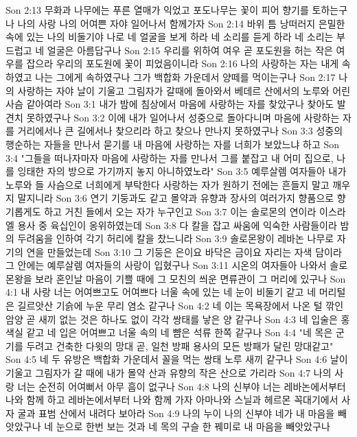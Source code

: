 Son 2:13  무화과 나무에는 푸른 열매가 익었고 포도나무는 꽃이 피어 향기를 토하는구나 나의 사랑 나의 어여쁜 자야 일어나서 함께가자
Son 2:14  바위 틈 낭떠러지 은밀한 속에 있는 나의 비둘기야 나로 네 얼굴을 보게 하라 네 소리를 듣게 하라 네 소리는 부드럽고 네 얼굴은 아름답구나
Son 2:15  우리를 위하여 여우 곧 포도원을 허는 작은 여우를 잡으라 우리의 포도원에 꽃이 피었음이니라
Son 2:16  나의 사랑하는 자는 내게 속하였고 나는 그에게 속하였구나 그가 백합화 가운데서 양떼를 먹이는구나
Son 2:17  나의 사랑하는 자야 날이 기울고 그림자가 갈때에 돌아와서 베데르 산에서의 노루와 어린 사슴 같아여라
Son 3:1  내가 밤에 침상에서 마음에 사랑하는 자를 찾았구나 찾아도 발견치 못하였구나
Son 3:2  이에 내가 일어나서 성중으로 돌아다니며 마음에 사랑하는 자를 거리에서나 큰 길에서나 찾으리라 하고 찾으나 만나지 못하였구나
Son 3:3  성중의 행순하는 자들을 만나서 묻기를 내 마음에 사랑하는 자를 너희가 보았느냐 하고
Son 3:4  "그들을 떠나자마자 마음에 사랑하는 자를 만나서 그를 붙잡고 내 어미 집으로, 나를 잉태한 자의 방으로 가기까지 놓지 아니하였노라"
Son 3:5  예루살렘 여자들아 내가 노루와 들 사슴으로 너희에게 부탁한다 사랑하는 자가 원하기 전에는 흔들지 말고 깨우지 말지니라
Son 3:6  연기 기둥과도 같고 몰약과 유향과 장사의 여러가지 향품으로 향기롭게도 하고 거친 들에서 오는 자가 누구인고
Son 3:7  이는 솔로몬의 연이라 이스라엘 용사 중 육십인이 옹위하였는데
Son 3:8  다 칼을 잡고 싸움에 익숙한 사람들이라 밤의 두려움을 인하여 각기 허리에 칼을 찼느니라
Son 3:9  솔로몬왕이 레바논 나무로 자기의 연을 만들었는데
Son 3:10  그 기둥은 은이요 바닥은 금이요 자리는 자색 담이라 그 안에는 예루살렘 여자들의 사랑이 입혔구나
Son 3:11  시온의 여자들아 나와서 솔로몬왕을 보라 혼인날 마음이 기쁠 때에 그 모친의 씌운 면류관이 그 머리에 있구나
Son 4:1  내 사랑 너는 어여쁘고도 어여쁘다 너울 속에 있는 네 눈이 비둘기 같고 네 머리털은 길르앗산 기슭에 누운 무리 염소 같구나
Son 4:2  네 이는 목욕장에서 나온 털 깎인 암양 곧 새끼 없는 것은 하나도 없이 각각 쌍태를 낳은 양 같구나
Son 4:3  네 입술은 홍색실 같고 네 입은 어여쁘고 너울 속의 네 뺨은 석류 한쪽 같구나
Son 4:4  "네 목은 군기를 두려고 건축한 다윗의 망대 곧, 일천 방패 용사의 모든 방패가 달린 망대같고"
Son 4:5  네 두 유방은 백합화 가운데서 꼴을 먹는 쌍태 노루 새끼 같구나
Son 4:6  날이 기울고 그림자가 갈 때에 내가 몰약 산과 유향의 작은 산으로 가리라
Son 4:7  나의 사랑 너는 순전히 어여뻐서 아무 흠이 없구나
Son 4:8  나의 신부야 너는 레바논에서부터 나와 함께 하고 레바논에서부터 나와 함께 가자 아마나와 스닐과 헤르몬 꼭대기에서 사자 굴과 표범 산에서 내려다 보아라
Son 4:9  나의 누이 나의 신부야 네가 내 마음을 빼앗았구나 네 눈으로 한번 보는 것과 네 목의 구슬 한 꿰미로 내 마음을 빼앗았구나
